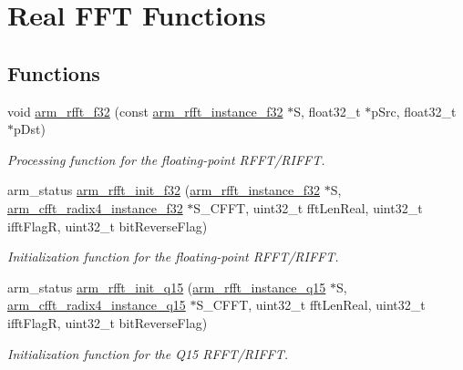 \hypertarget{group___r_f_f_t___r_i_f_f_t}{\section{Real F\-F\-T Functions}
\label{group___r_f_f_t___r_i_f_f_t}
}
\subsection*{Functions}
\begin{DoxyCompactItemize}
\item 
void \hyperlink{group___r_f_f_t___r_i_f_f_t_ga3df1766d230532bc068fc4ed69d0fcdc}{arm\-\_\-rfft\-\_\-f32} (const \hyperlink{structarm__rfft__instance__f32}{arm\-\_\-rfft\-\_\-instance\-\_\-f32} $\ast$S, float32\-\_\-t $\ast$p\-Src, float32\-\_\-t $\ast$p\-Dst)
\begin{DoxyCompactList}\small\item\em Processing function for the floating-\/point R\-F\-F\-T/\-R\-I\-F\-F\-T. \end{DoxyCompactList}\item 
arm\-\_\-status \hyperlink{group___r_f_f_t___r_i_f_f_t_ga10717ee326bf50832ef1c25b85a23068}{arm\-\_\-rfft\-\_\-init\-\_\-f32} (\hyperlink{structarm__rfft__instance__f32}{arm\-\_\-rfft\-\_\-instance\-\_\-f32} $\ast$S, \hyperlink{structarm__cfft__radix4__instance__f32}{arm\-\_\-cfft\-\_\-radix4\-\_\-instance\-\_\-f32} $\ast$S\-\_\-\-C\-F\-F\-T, uint32\-\_\-t fft\-Len\-Real, uint32\-\_\-t ifft\-Flag\-R, uint32\-\_\-t bit\-Reverse\-Flag)
\begin{DoxyCompactList}\small\item\em Initialization function for the floating-\/point R\-F\-F\-T/\-R\-I\-F\-F\-T. \end{DoxyCompactList}\item 
arm\-\_\-status \hyperlink{group___r_f_f_t___r_i_f_f_t_ga2530ebf44b7f5b559b191ff7265a9120}{arm\-\_\-rfft\-\_\-init\-\_\-q15} (\hyperlink{structarm__rfft__instance__q15}{arm\-\_\-rfft\-\_\-instance\-\_\-q15} $\ast$S, \hyperlink{structarm__cfft__radix4__instance__q15}{arm\-\_\-cfft\-\_\-radix4\-\_\-instance\-\_\-q15} $\ast$S\-\_\-\-C\-F\-F\-T, uint32\-\_\-t fft\-Len\-Real, uint32\-\_\-t ifft\-Flag\-R, uint32\-\_\-t bit\-Reverse\-Flag)
\begin{DoxyCompactList}\small\item\em Initialization function for the Q15 R\-F\-F\-T/\-R\-I\-F\-F\-T. \end{DoxyCompactList}\item 

\end{DoxyCompactItemize}
